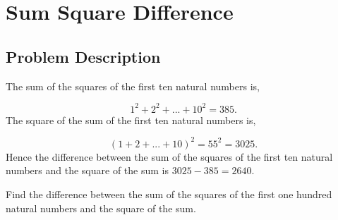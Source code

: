 \chapter{Sum Square Difference}
\section{Problem Description}
\begin{tcolorbox}
	The sum of the squares of the first ten natural numbers is,

	$$1^2 + 2^2 + ... + 10^2 = 385.$$
	The square of the sum of the first ten natural numbers is,

	$$(1 + 2 + ... + 10)^2 = 55^2 = 3025.$$
	Hence the difference between the sum of the squares of the first ten natural numbers and the square of the sum is $3025 - 385 = 2640$.

	Find the difference between the sum of the squares of the first one hundred natural numbers and the square of the sum.
\end{tcolorbox}
